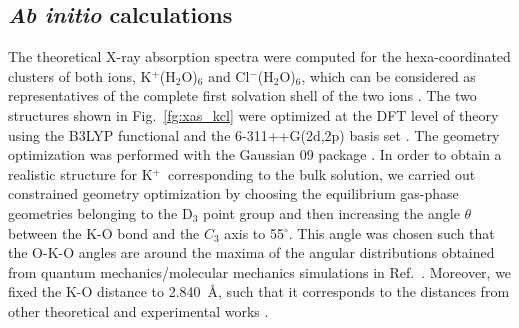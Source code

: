 \documentclass[journal=jpclcd,manuscript=letter]{achemso}
\begin{document}
\subsection{{\bf{\it Ab initio}} calculations}

The theoretical X-ray absorption spectra were computed for the hexa-coordinated clusters of both ions, K$^{+}$(H$_2$O)$_6$ and Cl$^{-}$(H$_2$O)$_6$, which can be considered as representatives of the complete first solvation shell of the two ions \citep{Ohtaki93:1157,soper06:180,ma14:1006}. The two structures shown in Fig.\ \ref{fg:xas_kcl} were optimized at the DFT level of theory using the B3LYP functional and the 6-311++G(2d,2p) basis set \citep{Krishnan80:650,Blaudeau97:5016}. The geometry optimization was performed with the Gaussian 09 package \citep{g09}. In order to obtain a realistic structure for K$^{+}$~corresponding to the bulk solution, we carried out constrained geometry optimization by choosing the equilibrium gas-phase geometries \citep{lee99:3995,lee02:5509} belonging to the D$_3$ point group and then increasing the angle $\theta$ between the K-O bond and the $C_3$ axis to 55$^{\circ}$. This angle was chosen such that the O-K-O angles are around the maxima of the angular distributions obtained from quantum mechanics/molecular mechanics simulations in Ref.\ \citep{ma14:1006}. Moreover, we fixed the K-O distance to 2.840~\AA, such that it corresponds to the distances from other theoretical and experimental works \citep{Ohtaki93:1157,soper06:180,ma14:1006}.
\end{document}
